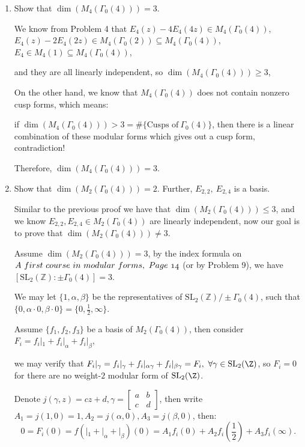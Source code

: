 \begin{enumerate}
\item Show that $\dim (M_4(\Gamma_0(4))) = 3$.

\begin{proofc}[解答]
    We know from Problem 4 that $E_4(z) - 4E_4(4z) \in M_4(\Gamma_0(4))$, 
    $E_4(z) - 2E_4(2z) \in M_4(\Gamma_0(2)) \subseteq M_4(\Gamma_0(4))$, $E_4 \in M_4(1) \subseteq M_4(\Gamma_0(4))$, 

    and they are all linearly independent, so $\dim (M_4(\Gamma_0(4))) \geq 3$,

    On the other hand, we know that $M_4(\Gamma_0(4))$ does not contain nonzero cusp forms,
    which means:
    
     if $\dim (M_4(\Gamma_0(4))) > 3 = \# \{\text{Cusps of} \ \Gamma_0(4)\}$, then there is a linear combination of these modular forms which gives out a cusp form,
     contradiction!

     Therefore, $\dim (M_4(\Gamma_0(4))) = 3$.
\end{proofc}
\item Show that $\dim (M_2(\Gamma_0(4))) = 2$. Further, $E_{2,2}, \ E_{2, 4}$ is a basis.

\begin{proofc}

Similar to the previous proof we have that $\dim (M_2(\Gamma_0(4))) \leq 3$, and we know $E_{2,2}, E_{2,4} \in M_2(\Gamma_0(4))$ are linearly independent, now our goal is to prove that $\dim (M_2(\Gamma_0(4))) \neq 3$.

Assume $\dim (M_2(\Gamma_0(4))) = 3$, by the index formula on $\mathnormal{A \ first \ course \ in \ modular \ forms, \ Page \ 14}$ (or by Problem 9), we have $[\mathrm{SL}_2(\mathbb{Z}) : \pm \Gamma_0(4)] = 3$.

We may let $\{1, \alpha, \beta\}$ be the representatives of $\mathrm{SL}_2(\mathbb{Z})/\pm\Gamma_0(4)$, 
such that $\{0, \alpha \cdot 0 , \beta \cdot 0\} = \{0, \frac12, \infty\}$.

Assume $\{f_1, f_2, f_3\}$ be a basis of $M_2(\Gamma_0(4))$, 
then consider $F_i = f_i |_1 + f_i |_{\alpha} + f_i |_{\beta}$,

we may verify that $F_i |_{\gamma} = f_i |_{\gamma} + f_i |_{\alpha\gamma} + f_i |_{\beta\gamma} = F_i, \ \forall \gamma \in \mathrm{SL}_2(\Z)$, 
so $F_i = 0$ for there are no weight-$2$ modular form of $\mathrm{SL}_2(\Z)$.

Denote $j(\gamma, z) = cz+d, \gamma = \begin{bmatrix}
    a & b \\
    c & d
\end{bmatrix}$, then write $A_1 = j(1, 0) = 1, A_2 = j(\alpha, 0), A_3 = j(\beta, 0)$,
then:
$$0 = F_i(0) = f(|_1 + |_{\alpha} + |_{\beta})(0) = A_1f_i(0) + A_2f_i(\frac12) + A_3f_i(\infty).$$


\end{proofc}
\end{enumerate}
